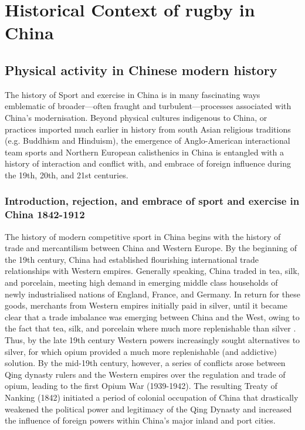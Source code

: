 {\section{Historical Context of rugby in China}

\subsection{Physical activity in Chinese modern history}
The history of Sport and exercise in China is in many fascinating ways emblematic of broader---often fraught and turbulent---processes associated with China's modernisation.  Beyond physical cultures indigenous to China, or practices imported much earlier in history from south Asian religious traditions (e.g. Buddhism and Hinduism), the emergence of Anglo-American interactional team sports and Northern European calisthenics in China is entangled with a history of interaction and conflict with, and embrace of foreign influence during the 19th, 20th, and 21st centuries.

  \subsubsection{Introduction, rejection, and embrace of sport and exercise in China 1842-1912}

The history of modern competitive sport in China begins with the history of trade and mercantilism between China and Western Europe.
By the beginning of the 19th century, China had established flourishing international trade relationships with Western empires.  Generally speaking, China traded in tea, silk, and porcelain, meeting high demand in emerging middle class households of newly industrialised nations of England, France, and Germany.  In return for these goods, merchants from Western empires initially paid in silver, until it became clear that a trade imbalance was emerging between China and the West, owing to the fact that tea, silk, and porcelain where much more replenishable than silver \citep{Fay2005}.  Thus, by the late 19th century Western powers increasingly sought alternatives to silver, for which opium provided a much more replenishable (and addictive) solution.  By the mid-19th century, however, a series of conflicts arose between Qing dynasty rulers and the Western empires over the regulation and trade of opium, leading to the first Opium War (1939-1942).  The resulting Treaty of Nanking (1842) initiated a period of colonial occupation of China that drastically weakened the political power and legitimacy of the Qing Dynasty and increased the influence of foreign powers within China's major inland and port cities.

}
